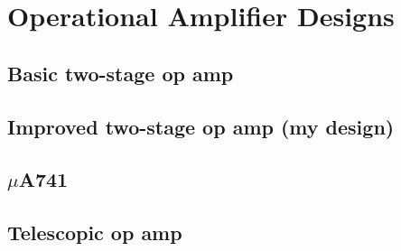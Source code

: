 \chapter{Operational Amplifier Designs}

\section{Basic two-stage op amp}

\section{Improved two-stage op amp (my design)}

\section{$\mu$A741}

\section{Telescopic op amp}
